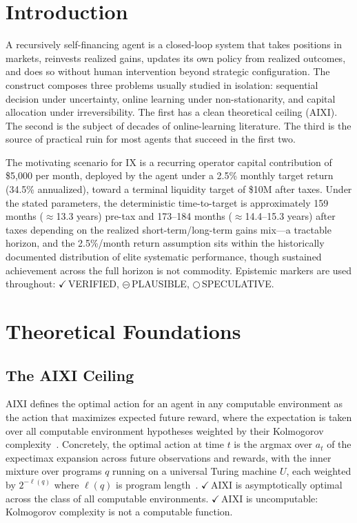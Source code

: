 \documentclass[conference,10pt,letterpaper]{IEEEtran}
\newcommand{\EV}{\textcolor{black}{\ensuremath{\checkmark}}\,}        %
\newcommand{\EP}{\textcolor{black}{\ensuremath{\circleddash}}\,}     %
\newcommand{\ES}{\textcolor{black}{\ensuremath{\bigcirc}}\,}         %
\begin{document}
\section{Introduction}

A recursively self-financing agent is a closed-loop system that takes
positions in markets, reinvests realized gains, updates its own policy from
realized outcomes, and does so without human intervention beyond strategic
configuration. The construct composes three problems usually studied in
isolation: sequential decision under uncertainty, online learning under
non-stationarity, and capital allocation under irreversibility. The first
has a clean theoretical ceiling (AIXI). The second is the subject of
decades of online-learning literature. The third is the source of practical
ruin for most agents that succeed in the first two.

The motivating scenario for IX is a recurring operator capital
contribution of \$5{,}000 per month, deployed by the agent under a 2.5\%
monthly target return (34.5\% annualized), toward a terminal liquidity
target of \$10M after taxes. Under the stated parameters, the
deterministic time-to-target is approximately 159 months ($\approx$13.3
years) pre-tax and 173--184 months ($\approx$14.4--15.3 years) after
taxes depending on the realized short-term/long-term gains mix---a
tractable horizon, and the 2.5\%/month return assumption sits within
the historically documented distribution of elite systematic
performance, though sustained achievement across the full horizon is
not commodity. Epistemic markers are used throughout: \EV{}VERIFIED,
\EP{}PLAUSIBLE, \ES{}SPECULATIVE.

\section{Theoretical Foundations}

\subsection{The AIXI Ceiling}

AIXI defines the optimal action for an agent in any computable environment
as the action that maximizes expected future reward, where the expectation
is taken over all computable environment hypotheses weighted by their
Kolmogorov complexity~\cite{hutter2005universal}. Concretely, the optimal
action at time $t$ is the argmax over $a_t$ of the expectimax expansion
across future observations and rewards, with the inner mixture over programs
$q$ running on a universal Turing machine $U$, each weighted by
$2^{-\ell(q)}$ where $\ell(q)$ is program length~\cite{solomonoff1964formal}.
\EV{}AIXI is asymptotically optimal across the class of all computable
environments. \EV{}AIXI is uncomputable: Kolmogorov complexity is not a
computable function.
\end{document}

